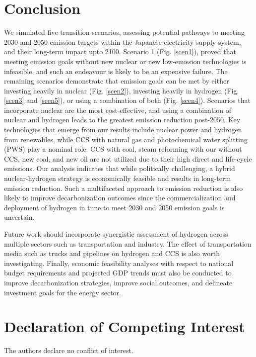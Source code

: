 \section{Conclusion} \label{Conclusion}

We simulated five transition scenarios, assessing potential pathways to meeting 2030 and 2050 emission targets within the Japanese electricity supply system, and their long-term impact upto 2100. Scenario 1 (Fig. \ref{scen1}), proved that meeting emission goals without new nuclear or new low-emission technologies is infeasible, and such an endeavour is likely to be an expensive failure. The remaining scenarios demonstrate that emission goals can be met by either investing heavily in nuclear (Fig. \ref{scen2}), investing heavily in hydrogen (Fig. \ref{scen3} and \ref{scen5}), or using a combination of both (Fig. \ref{scen4}). Scenarios that incorporate nuclear are the most cost-effective, and using a combination of nuclear and hydrogen leads to the greatest emission reduction post-2050. Key technologies that emerge from our results include nuclear power and hydrogen from renewables, while \gls{CCS} with natural gas and photochemical water splitting (\gls{PWS}) play a nominal role. CCS with coal, steam reforming with our without CCS, new coal, and new oil are not utilized due to their high direct and life-cycle emissions. Our analysis indicates that while politically challenging, a hybrid nuclear-hydrogen strategy is economically feasible and results in long-term emission reduction. Such a multifaceted approach to emission reduction is also likely to improve decarbonization outcomes since the commercialization and deployment of hydrogen in time to meet 2030 and 2050 emission goals is uncertain.

Future work should incorporate synergistic assessment of hydrogen across multiple sectors such as transportation and industry. The effect of transportation media such as trucks and pipelines on hydrogen and CCS is also worth investigating. Finally, economic feasibility analyses with respect to national budget requirements and projected GDP trends must also be conducted to improve decarbonization strategies, improve social outcomes, and delineate investment goals for the energy sector.

\section{Declaration of Competing Interest}
The authors declare no conflict of interest.